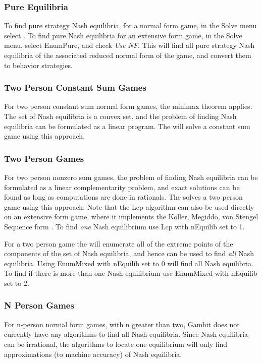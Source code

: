 {\subsubsection{Pure Equilibria}\label{purenashsec}
To find pure strategy Nash equilibria, for a normal form game, in the Solve 
menu select .  
To find pure Nash equilibria for an extensive 
form game,  in the Solve menu, select EnumPure, 
and check {\em Use NF}.  This will find 
all pure strategy Nash equilibria of the associated reduced normal form of 
the game, and convert them to behavior strategies.  

\subsubsection{Two Person Constant Sum Games}\label{csumsec}
For two person constant sum normal form 
games, the minimax theorem applies.  The set of 
Nash equilibria is a convex set, and the problem of finding Nash equilibria can be 
formulated as a linear program.  The  will solve a 
constant sum game 
using this approach.  

\subsubsection{Two Person Games}\label{twopersec}
For two person nonzero sum 
games, the problem of finding Nash equilibria can be formulated as 
a linear complementarity problem, and exact solutions can be found as 
long as computations are done in rationals.  The 
 solves a two person 
game using this approach.  Note that the Lcp algorithm can also be used 
directly on an extensive form game, where it implements the Koller, Megiddo, 
von Stengel Sequence form \cite{KolMegSte:94}.  To find {\em one} Nash equilibrium 
use Lcp with nEquilib set to 1.  

For a two person game the  
will enumerate all of the extreme points of the components of the set of 
Nash equilibria, and hence can be used to find {\em all} Nash equilibria.  Using 
EnumMixed with nEquilib set to 0 will find all Nash equilibria.  To find if 
there is more than one Nash equilibrium use EnumMixed with nEquilib set to 2.  

\subsubsection{N Person Games}\label{npernashsec}
For n-person normal form games, with n greater than two, Gambit does not 
currently have any algorithms 
to find all Nash equilibria.  Since Nash equilibria can be irrational, the algorithms to 
locate one equilibrium will only find approximations (to machine accuracy) of Nash 
equilibria. 

}
